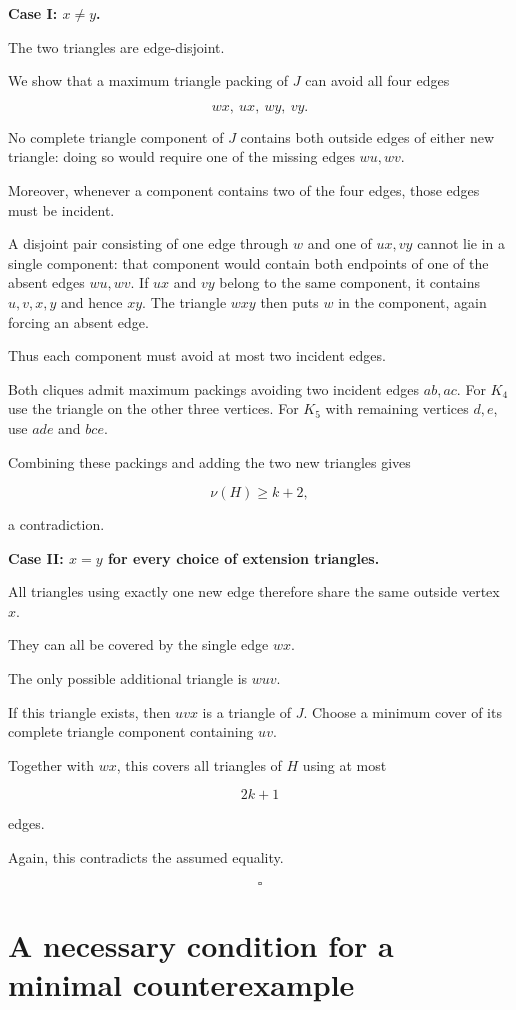 \documentclass[11pt]{article}
\begin{document}
\textbf{Case I: \(x\neq y\).}

The two triangles are edge-disjoint.

We show that a maximum triangle packing of \(J\) can avoid all four edges

\[
wx,\ ux,\ wy,\ vy.
\]

No complete triangle component of \(J\) contains both outside edges of either new triangle: doing so would require one of the missing edges \(wu,wv\).

Moreover, whenever a component contains two of the four edges, those edges must be incident.

A disjoint pair consisting of one edge through $w$ and one of $ux,vy$ cannot lie in a single component: that component would contain both endpoints of one of the absent edges $wu,wv$. If $ux$ and $vy$ belong to the same component, it contains $u,v,x,y$ and hence $xy$. The triangle $wxy$ then puts $w$ in the component, again forcing an absent edge.

Thus each component must avoid at most two incident edges.

Both cliques admit maximum packings avoiding two incident edges $ab,ac$. For $K_4$ use the triangle on the other three vertices. For $K_5$ with remaining vertices $d,e$, use $ade$ and $bce$.

Combining these packings and adding the two new triangles gives

\[
\nu(H)\geq k+2,
\]

a contradiction.

\textbf{Case II: \(x=y\) for every choice of extension triangles.}

All triangles using exactly one new edge therefore share the same outside vertex \(x\).

They can all be covered by the single edge \(wx\).

The only possible additional triangle is \(wuv\).

If this triangle exists, then \(uvx\) is a triangle of \(J\). Choose a minimum cover of its complete triangle component containing \(uv\).

Together with \(wx\), this covers all triangles of \(H\) using at most

\[
2k+1
\]

edges.

Again, this contradicts the assumed equality.

\[
\square
\]

\section{A necessary condition for a minimal counterexample}
\end{document}
